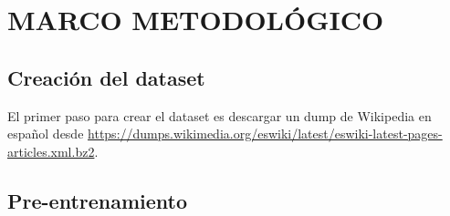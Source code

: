 \documentclass[../main.tex]{subfiles}
\begin{document}
\chapter{MARCO METODOLÓGICO}


\section{Creación del dataset}

El primer paso para crear el dataset es descargar un dump de Wikipedia en español desde \url{https://dumps.wikimedia.org/eswiki/latest/eswiki-latest-pages-articles.xml.bz2}.


\section{Pre-entrenamiento}


\end{document}
